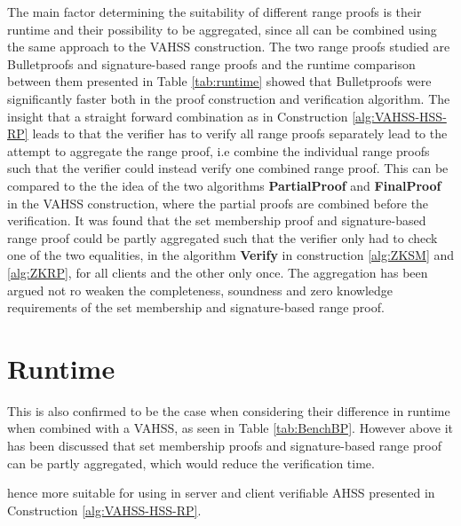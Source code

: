 The main factor determining the suitability of different range proofs is their runtime and their possibility to be aggregated, since all can be combined using the same approach to the VAHSS construction. The two range proofs studied are Bulletproofs and signature-based range proofs and the runtime comparison between them presented in Table \ref{tab:runtime} showed that Bulletproofs were significantly faster both in the proof construction and verification algorithm. The insight that a straight forward combination as in Construction \ref{alg:VAHSS-HSS-RP} leads to that the verifier has to verify all range proofs separately lead to the attempt to aggregate the range proof, i.e combine the individual range proofs such that the verifier could instead verify one combined range proof. This can be compared to the the idea of the two algorithms \textbf{PartialProof} and \textbf{FinalProof} in the VAHSS construction, where the partial proofs are combined before the verification. It was found that the set membership proof and signature-based range proof could be partly aggregated such that the verifier only had to check one of the two equalities, in the algorithm \textbf{Verify} in construction \ref{alg:ZKSM} and \ref{alg:ZKRP}, for all clients and the other only once. The aggregation has been argued not ro weaken the completeness, soundness and zero knowledge requirements of the set membership and signature-based range proof.


\section{Runtime}
This is also confirmed to be the case when considering their difference in runtime when combined with a VAHSS, as seen in Table \ref{tab:BenchBP}. However above it has been discussed that set membership proofs and signature-based range proof can be partly aggregated, which would reduce the verification time.


  hence more suitable for using in server and client verifiable AHSS presented in Construction \ref{alg:VAHSS-HSS-RP}. 
  
  

